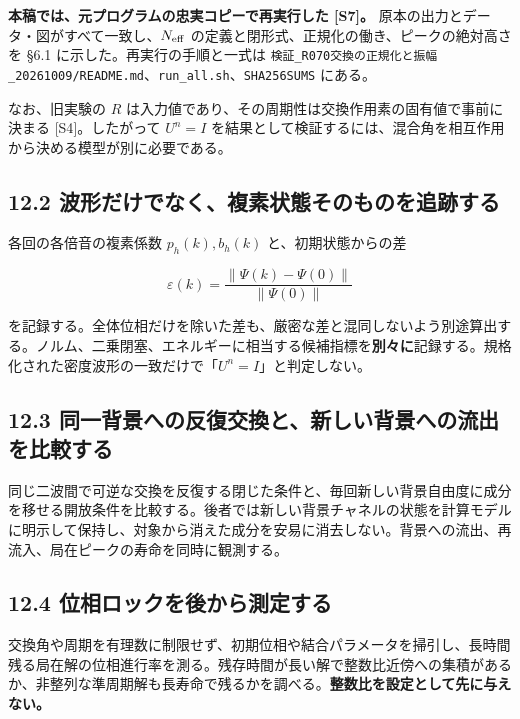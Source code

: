 \documentclass[
  a4paper,
]{ltjsarticle}
\begin{document}
\textbf{本稿では、元プログラムの忠実コピーで再実行した {[}S7{]}。}
原本の出力とデータ・図がすべて一致し、\(N_{\rm eff}\)
の定義と閉形式、正規化の働き、ピークの絶対高さを §6.1
に示した。再実行の手順と一式は
\texttt{検証\_\allowbreak{}R070交換の正規化と振幅\_\allowbreak{}20261009/\allowbreak{}README.md}、\texttt{run\_\allowbreak{}all.sh}、\texttt{SHA256SUMS}
にある。

なお、旧実験の \(R\)
は入力値であり、その周期性は交換作用素の固有値で事前に決まる
{[}S4{]}。したがって \(U^n=I\)
を結果として検証するには、混合角を相互作用から決める模型が別に必要である。

\subsection{12.2
波形だけでなく、複素状態そのものを追跡する}\label{ux6ce2ux5f62ux3060ux3051ux3067ux306aux304fux8907ux7d20ux72b6ux614bux305dux306eux3082ux306eux3092ux8ffdux8de1ux3059ux308b}

各回の各倍音の複素係数 \(p_h(k),b_h(k)\) と、初期状態からの差

\[
\varepsilon(k)=
\frac{\|\Psi(k)-\Psi(0)\|}{\|\Psi(0)\|}
\]

を記録する。全体位相だけを除いた差も、厳密な差と混同しないよう別途算出する。ノルム、二乗閉塞、エネルギーに相当する候補指標を\textbf{別々に}記録する。規格化された密度波形の一致だけで「\(U^n=I\)」と判定しない。

\subsection{12.3
同一背景への反復交換と、新しい背景への流出を比較する}\label{ux540cux4e00ux80ccux666fux3078ux306eux53cdux5fa9ux4ea4ux63dbux3068ux65b0ux3057ux3044ux80ccux666fux3078ux306eux6d41ux51faux3092ux6bd4ux8f03ux3059ux308b}

同じ二波間で可逆な交換を反復する閉じた条件と、毎回新しい背景自由度に成分を移せる開放条件を比較する。後者では新しい背景チャネルの状態を計算モデルに明示して保持し、対象から消えた成分を安易に消去しない。背景への流出、再流入、局在ピークの寿命を同時に観測する。

\subsection{12.4
位相ロックを後から測定する}\label{ux4f4dux76f8ux30edux30c3ux30afux3092ux5f8cux304bux3089ux6e2cux5b9aux3059ux308b}

交換角や周期を有理数に制限せず、初期位相や結合パラメータを掃引し、長時間残る局在解の位相進行率を測る。残存時間が長い解で整数比近傍への集積があるか、非整列な準周期解も長寿命で残るかを調べる。\textbf{整数比を設定として先に与えない。}
\end{document}
